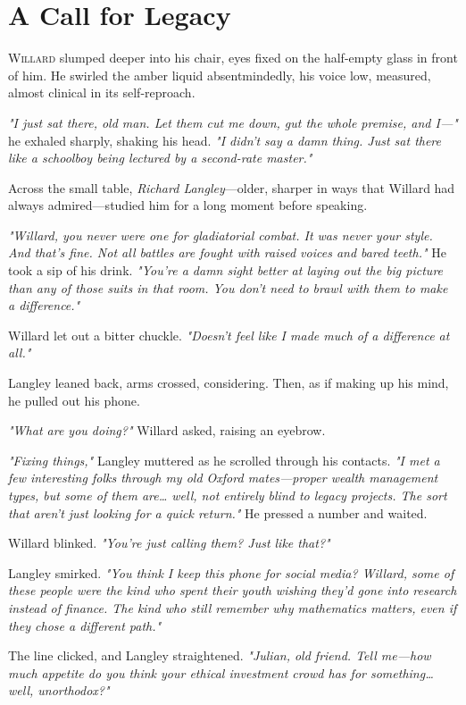 \newpage
\section*{A Call for Legacy}

\lettrine{W}{illard} slumped deeper into his chair, eyes fixed on the half-empty glass in front of him. He swirled the amber liquid absentmindedly, his voice low, measured, almost clinical in its self-reproach.

\textit{"I just sat there, old man. Let them cut me down, gut the whole premise, and I—"} he exhaled sharply, shaking his head. \textit{"I didn't say a damn thing. Just sat there like a schoolboy being lectured by a second-rate master."}

Across the small table, \textit{Richard Langley}—older, sharper in ways that Willard had always admired—studied him for a long moment before speaking.

\textit{"Willard, you never were one for gladiatorial combat. It was never your style. And that’s fine. Not all battles are fought with raised voices and bared teeth."} He took a sip of his drink. \textit{"You’re a damn sight better at laying out the big picture than any of those suits in that room. You don’t need to brawl with them to make a difference."}

Willard let out a bitter chuckle. \textit{"Doesn't feel like I made much of a difference at all."}

Langley leaned back, arms crossed, considering. Then, as if making up his mind, he pulled out his phone.

\textit{"What are you doing?"} Willard asked, raising an eyebrow.

\textit{"Fixing things,"} Langley muttered as he scrolled through his contacts. \textit{"I met a few interesting folks through my old Oxford mates—proper wealth management types, but some of them are… well, not entirely blind to legacy projects. The sort that aren’t just looking for a quick return."} He pressed a number and waited.

Willard blinked. \textit{"You’re just calling them? Just like that?"}

Langley smirked. \textit{"You think I keep this phone for social media? Willard, some of these people were the kind who spent their youth wishing they’d gone into research instead of finance. The kind who still remember \textit{why} mathematics matters, even if they chose a different path."} 

The line clicked, and Langley straightened. \textit{"Julian, old friend. Tell me—how much appetite do you think your ethical investment crowd has for something… well, unorthodox?"}

